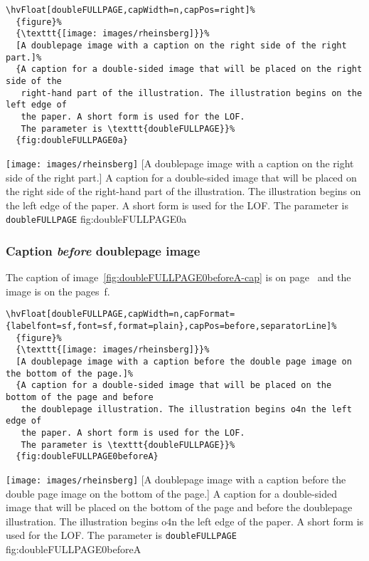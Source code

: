 \documentclass[twoside]{scrartcl}
\let\hvBlindtext\Blindtext
\def\Blindtext{\par\color{black!40}\hvBlindtext\par\normalcolor}
\begin{document}
\begin{lstlisting}
\hvFloat[doubleFULLPAGE,capWidth=n,capPos=right]%
  {figure}%
  {\texttt{[image: images/rheinsberg]}}%
  [A doublepage image with a caption on the right side of the right part.]%
  {A caption for a double-sided image that will be placed on the right side of the
   right-hand part of the illustration. The illustration begins on the left edge of 
   the paper. A short form is used for the LOF. 
   The parameter is \texttt{doubleFULLPAGE}}%
  {fig:doubleFULLPAGE0a}
\end{lstlisting}


%
  {\texttt{[image: images/rheinsberg]}}%
  [A doublepage image with a caption on the right side of the right part.]%
  {A caption for a double-sided image that will be placed on the right side of the
   right-hand part of the illustration. The illustration begins on the left edge of 
   the paper. A short form is used for the LOF. 
   The parameter is \texttt{doubleFULLPAGE}}%
  {fig:doubleFULLPAGE0a}

\Blindtext

\Blindtext


\subsubsection{Caption \emph{before} doublepage image}
The caption of image~\ref{fig:doubleFULLPAGE0beforeA-cap} is on page~\pageref{fig:doubleFULLPAGE0beforeA-cap} and the image
is on the pages~\pageref{fig:doubleFULLPAGE0beforeA}f.

\begin{lstlisting}
\hvFloat[doubleFULLPAGE,capWidth=n,capFormat={labelfont=sf,font=sf,format=plain},capPos=before,separatorLine]%
  {figure}%
  {\texttt{[image: images/rheinsberg]}}%
  [A doublepage image with a caption before the double page image on the bottom of the page.]%
  {A caption for a double-sided image that will be placed on the bottom of the page and before
   the doublepage illustration. The illustration begins o4n the left edge of 
   the paper. A short form is used for the LOF. 
   The parameter is \texttt{doubleFULLPAGE}}%
  {fig:doubleFULLPAGE0beforeA}
\end{lstlisting}


%
  {\texttt{[image: images/rheinsberg]}}%
  [A doublepage image with a caption before the double page image on the bottom of the page.]%
  {A caption for a double-sided image that will be placed on the bottom of the page and before
   the doublepage illustration. The illustration begins o4n the left edge of 
   the paper. A short form is used for the LOF. 
   The parameter is \texttt{doubleFULLPAGE}}%
  {fig:doubleFULLPAGE0beforeA}
\end{document}
